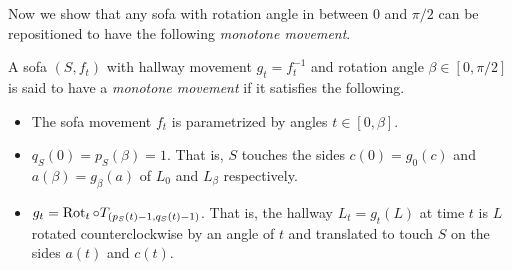 Now we show that any sofa with rotation angle in between $0$ and $\pi / 2$ can be repositioned to have the following \emph{monotone movement}.
\begin{definition}
\label{def:monotone-movement}
A sofa $(S, f_t)$ with hallway movement $g_t = f_t^{-1}$ and rotation angle $\beta \in [0, \pi / 2]$ is said to have a \emph{monotone movement} if it satisfies the following.
\begin{itemize}
	\item The sofa movement $f_t$ is parametrized by angles $t \in [0, \beta]$.
	\item $q_{S}(0) = p_{S}(\beta) = 1$. That is, $S$ touches the sides $c(0) = g_0(c)$ and $a(\beta) = g_\beta(a)$ of $L_0$ and $L_\beta$ respectively.
	\item $g_{t} = \operatorname{Rot}_t \circ T_{(p_{S}(t) -1, q_{S}(t) -1)}$. That is, the hallway $L_{t} = g_t(L)$ at time $t$ is $L$ rotated counterclockwise by an angle of $t$ and translated to touch $S$ on the sides $a(t)$ and $c(t)$.
\end{itemize}
\end{definition}

